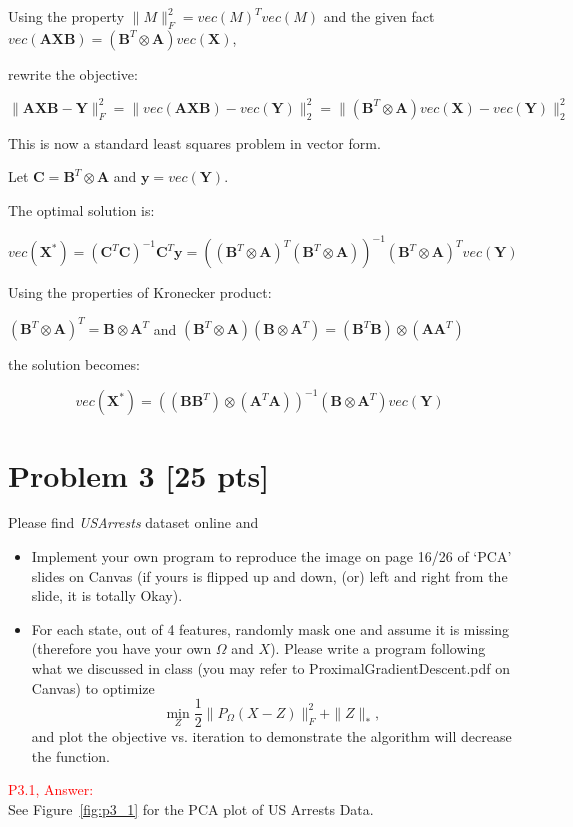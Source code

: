 \documentclass[11pt]{article}
\newcommand{\mtx}[1]{\mathbf{#1}}
\newcommand{\vct}[1]{\mathbf{#1}}
\def \mA {\mtx{A}}
\def \mB {\mtx{B}}
\def \mX {\mtx{X}}
\def \mY {\mtx{Y}}
\def \vy {\vct{y}}
\def \mC {\mtx{C}}
\def \mB {\mtx{B}}
\def \mA {\mtx{A}}
\def \mX {\mtx{X}}
\def \mY {\mtx{Y}}
\begin{document}
Using the property $\|M\|_F^2 = vec(M)^Tvec(M)$ and the given fact $vec(\mA\mX\mB)=(\mB^T\otimes\mA)vec(\mX)$,

rewrite the objective:

\[
\|\mA\mX\mB-\mY\|_F^2 = \|vec(\mA\mX\mB)-vec(\mY)\|_2^2 = \|(\mB^T\otimes\mA)vec(\mX)-vec(\mY)\|_2^2
\]

This is now a standard least squares problem in vector form. 

Let $\mC = \mB^T\otimes\mA$ and $\vy = vec(\mY)$. 

The optimal solution is:

\[
vec(\mX^*) = (\mC^T\mC)^{-1}\mC^T\vy = ((\mB^T\otimes\mA)^T(\mB^T\otimes\mA))^{-1}(\mB^T\otimes\mA)^Tvec(\mY)
\]

Using the properties of Kronecker product: 

$(\mB^T\otimes\mA)^T = \mB\otimes\mA^T$ and $(\mB^T\otimes\mA)(\mB\otimes\mA^T) = (\mB^T\mB)\otimes(\mA\mA^T)$

the solution becomes:

\[
vec(\mX^*) = ((\mB\mB^T)\otimes(\mA^T\mA))^{-1}(\mB\otimes\mA^T)vec(\mY)
\]


\newpage

\section*{Problem 3 [25 pts]}
Please find \textit{USArrests} dataset online and 
\begin{itemize}
	\item Implement your own program to reproduce the image on page 16/26 of `PCA' slides on Canvas (if yours is flipped up and down, (or) left and right from the slide, it is totally Okay).
	\item For each state, out of 4 features, randomly mask one and assume it is missing (therefore you have your own $\Omega$ and $X$). Please write a program following what we discussed in class (you may refer to ProximalGradientDescent.pdf on Canvas) to optimize  
		\begin{equation}
		\min_{Z} \frac{1}{2}\|P_\Omega(X-Z)\|_F^2+\|Z\|_*,
	\end{equation}
	and plot the objective vs. iteration to demonstrate the algorithm will decrease the function.
\end{itemize}

\textcolor{red}{P3.1, Answer:}\\

See Figure~\ref{fig:p3_1} for the PCA plot of US Arrests Data.
\end{document}
